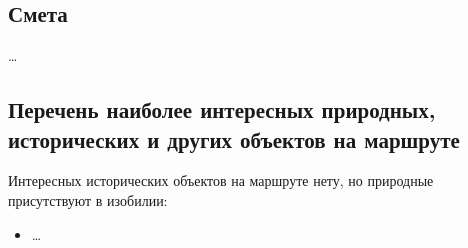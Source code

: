 	
	\subsection{Смета}
		\dots		


	\subsection{Перечень наиболее интересных природных, исторических и других объектов на маршруте}
		Интересных исторических объектов на маршруте нету, но природные присутствуют в изобилии:
		\begin{itemize}
			\item \dots
		\end{itemize}
		